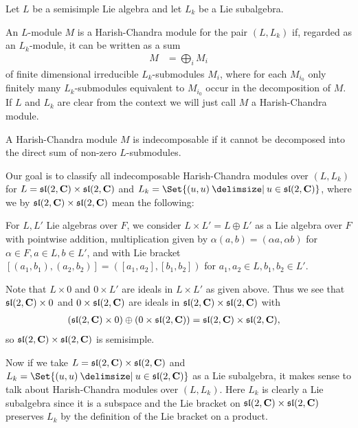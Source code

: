 Let $L$ be a semisimple Lie algebra and let $L_k$ be a Lie subalgebra.
\begin{definition}\label{def:HarishChandra}
  An $L$-module $M$ is a Harish-Chandra module for the pair $(L,L_k)$ if, regarded as an $L_k$-module, it can be written as a sum
  \begin{align*}
    M &= \bigoplus_{i} M_i
  \end{align*}
  of finite dimensional irreducible $L_k$-submodules $M_i$, where for each $M_{i_0}$ only finitely many $L_k$-submodules equivalent to $M_{i_0}$ occur in the decomposition of $M$. If $L$ and $L_k$ are clear from the context we will just call $M$ a Harish-Chandra module.

  A Harish-Chandra module $M$ is indecomposable if it cannot be decomposed into the direct sum of non-zero $L$-submodules.
\end{definition}

Our goal is to classify all indecomposable Harish-Chandra modules over $(L,L_k)$ for $L=\mathfrak{sl}(2,\mathbf{C})\times \mathfrak{sl}(2,\mathbf{C})$ and $L_k=\Set{(u,u)\given u\in\slc}$, where we by $\mathfrak{sl}(2,\mathbf{C})\times \mathfrak{sl}(2,\mathbf{C})$ mean the following:

For $L,L'$ Lie algebras over $F$, we consider $L\times L'=L\oplus L'$ as a Lie algebra over $F$ with pointwise addition, multiplication given by $\alpha(a,b)=(\alpha a,\alpha b)$ for $\alpha\in F,a\in L,b\in L'$, and with Lie bracket $[(a_1,b_1),(a_2,b_2)]=([a_1,a_2],[b_1,b_2])$ for $a_1,a_2\in L,b_1,b_2\in L'$.

\begin{remark}
  Note that $L\times 0$ and $0\times L'$ are ideals in $L\times L'$ as given above. Thus we see that $\mathfrak{sl}(2,\mathbf{C})\times 0$ and $0\times \mathfrak{sl}(2,\mathbf{C})$ are ideals in $\mathfrak{sl}(2,\mathbf{C})\times \mathfrak{sl}(2,\mathbf{C})$ with
  \begin{align*}
    (\mathfrak{sl}(2,\mathbf{C})\times 0) \oplus (0\times\mathfrak{sl}(2,\mathbf{C})) &= \mathfrak{sl}(2,\mathbf{C})\times \mathfrak{sl}(2,\mathbf{C}),
  \end{align*}
  so $\mathfrak{sl}(2,\mathbf{C})\times \mathfrak{sl}(2,\mathbf{C})$ is semisimple. 

  Now if we take $L=\mathfrak{sl}(2,\mathbf{C})\times \mathfrak{sl}(2,\mathbf{C})$ and $L_k=\Set{(u,u)\given u\in\slc}$ as a Lie subalgebra, it makes sense to talk about Harish-Chandra modules over $(L,L_k)$. Here $L_k$ is clearly a Lie subalgebra since it is a subspace and the Lie bracket on $\mathfrak{sl}(2,\mathbf{C})\times \mathfrak{sl}(2,\mathbf{C})$ preserves $L_k$ by the definition of the Lie bracket on a product. 
\end{remark}

